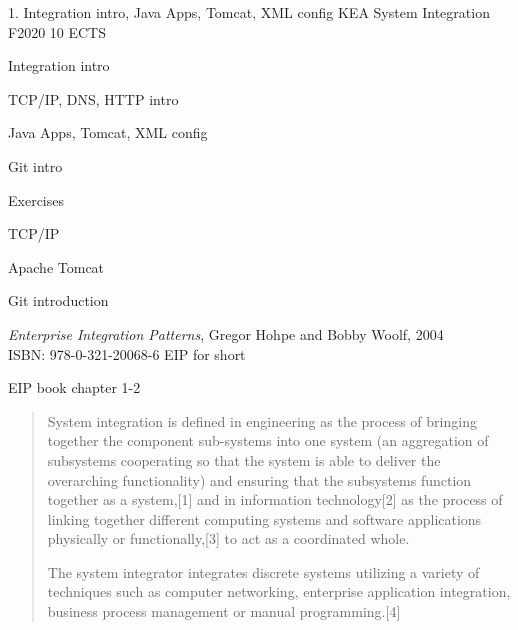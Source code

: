 \documentclass[Screen16to9,17pt]{foils}
\begin{document}
\mytitlepage
{1. Integration intro, Java Apps, Tomcat, XML config}
{KEA System Integration F2020 10 ECTS}


\begin{list2}
\item Integration intro
\item TCP/IP, DNS, HTTP intro

\item Java Apps, Tomcat, XML config

\item Git intro
\end{list2}

Exercises
\begin{list2}
\item TCP/IP
\item Apache Tomcat
\item Git introduction
\end{list2}





\emph{Enterprise Integration Patterns}, Gregor Hohpe and Bobby Woolf, 2004\\
ISBN: 978-0-321-20068-6 EIP for short

\begin{list1}
\item EIP book chapter 1-2
\end{list1}


\begin{quote}
  System integration is defined in engineering as the process of bringing together the component sub-systems into one system (an aggregation of subsystems cooperating so that the system is able to deliver the overarching functionality) and ensuring that the subsystems function together as a system,[1] and in information technology[2] as the process of linking together different computing systems and software applications physically or functionally,[3] to act as a coordinated whole.

  The system integrator integrates discrete systems utilizing a variety of techniques such as computer networking, enterprise application integration, business process management or manual programming.[4]
\end{quote}
\end{document}
